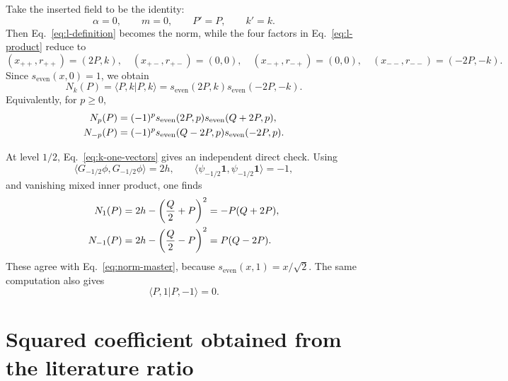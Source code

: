\documentclass[11pt]{article}
\newcommand{\one}{\mathbf 1}
\newcommand{\se}{s_{\mathrm{even}}}
\begin{document}
Take the inserted field to be the identity:
\begin{equation}
 \alpha=0,
 \qquad m=0,
 \qquad P'=P,
 \qquad k'=k.
 \label{eq:norm-specialization}
\end{equation}
Then Eq.~\eqref{eq:l-definition} becomes the norm, while the four factors in
Eq.~\eqref{eq:l-product} reduce to
\begin{equation}
 (x_{++},r_{++})=(2P,k),
 \quad
 (x_{+-},r_{+-})=(0,0),
 \quad
 (x_{-+},r_{-+})=(0,0),
 \quad
 (x_{--},r_{--})=(-2P,-k).
 \label{eq:norm-four-factors}
\end{equation}
Since \(\se(x,0)=1\), we obtain
\begin{equation}
 \boxed{
 N_k(P)
 =\langle P,k|P,k\rangle
 =\se(2P,k)\se(-2P,-k).}
 \label{eq:norm-master}
\end{equation}
Equivalently, for \(p\ge0\),
\begin{align}
 N_p(P)&=(-1)^p\se(2P,p)\se(Q+2P,p),
 \notag\\
 N_{-p}(P)&=(-1)^p\se(Q-2P,p)\se(-2P,p).
 \label{eq:norm-piecewise}
\end{align}

At level \(1/2\), Eq.~\eqref{eq:k-one-vectors} gives an independent direct
check.  Using
\begin{equation}
 \langle G_{-1/2}\phi,G_{-1/2}\phi\rangle=2h,
 \qquad
 \langle \psi_{-1/2}\one,\psi_{-1/2}\one\rangle=-1,
 \label{eq:level-half-inner-products}
\end{equation}
and vanishing mixed inner product, one finds
\begin{align}
 N_1(P)
 &=2h-\left(\frac Q2+P\right)^2
 =-P(Q+2P),
 \notag\\
 N_{-1}(P)
 &=2h-\left(\frac Q2-P\right)^2
 =P(Q-2P).
 \label{eq:level-half-norms}
\end{align}
These agree with Eq.~\eqref{eq:norm-master}, because
\(\se(x,1)=x/\sqrt2\).  The same computation also gives
\begin{equation}
 \langle P,1|P,-1\rangle=0.
 \label{eq:level-half-orthogonality}
\end{equation}

\section{Squared coefficient obtained from the literature ratio}
\end{document}
